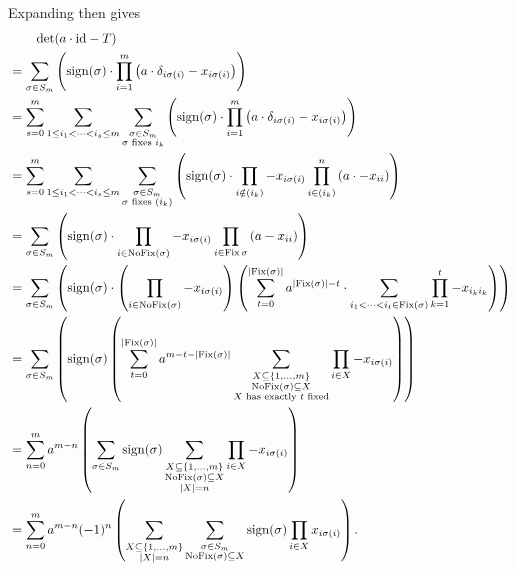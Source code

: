 \begin{problem}
\begin{sol}
		Expanding then gives
		\begin{align*}
			&\qquad \det (a \cdot \mathrm{id} - T) \\
			&= \sum_{\sigma \in S_m} \left( \operatorname{sign}(\sigma)
			\cdot \prod_{i=1}^m \left( a \cdot \delta_{i \sigma(i)} - x_{i \sigma(i)} \right)\right) \\
			&=
			\sum_{s=0}^m
			\sum_{1 \le i_1 < \dots < i_s \le m}
			\sum_{\substack{\sigma \in S_m \\ \sigma \text{ fixes } i_k}}
			\left( \operatorname{sign}(\sigma)
			\cdot \prod_{i=1}^m \left( a \cdot \delta_{i \sigma(i)} - x_{i \sigma(i)} \right)\right) \\
			&=
			\sum_{s=0}^m
			\sum_{1 \le i_1 < \dots < i_s \le m}
			\sum_{\substack{\sigma \in S_m \\ \sigma \text{ fixes } (i_k)}}
			\left( \operatorname{sign}(\sigma)
			\cdot \prod_{i \notin (i_k)} -x_{i \sigma(i)}
			\prod_{i \in (i_k)}^n \left( a \cdot - x_{ii}
			\right)\right) \\
			&=
			\sum_{\sigma \in S_m}
			\left( \operatorname{sign}(\sigma)
			\cdot \prod_{i \in \operatorname{NoFix}(\sigma)} -x_{i \sigma(i)}
			\prod_{i \in \operatorname{Fix}{\sigma}} \left( a - x_{ii}
			\right)\right) \\
			&=
			\sum_{\sigma \in S_m}
			\left( \operatorname{sign}(\sigma)
			\cdot \left( \prod_{i \in \operatorname{NoFix}(\sigma)} -x_{i \sigma(i)} \right)
			\left( \sum_{t=0}^{\left\lvert \operatorname{Fix}(\sigma) \right\rvert}
			a^{\left\lvert \operatorname{Fix}(\sigma) \right\rvert - t} \cdot \sum_{i_1 < \dots < i_t \in \operatorname{Fix}(\sigma)}
			\prod_{k=1}^t -x_{i_k i_k} \right)
			\right) \\
			&=
			\sum_{\sigma \in S_m}
			\left( \operatorname{sign}(\sigma)
			\left( \sum_{t=0}^{\left\lvert \operatorname{Fix}(\sigma) \right\rvert}
			a^{m-t-\left\lvert \operatorname{Fix}(\sigma) \right\rvert}
			\sum_{\substack{X \subseteq \{1, \dots, m\} \\ \operatorname{NoFix}(\sigma) \subseteq X \\ X \text{ has exactly $t$ fixed}}} \prod_{i \in X} -x_{i \sigma(i)}
			\right) \right) \\
			&=
			\sum_{n=0}^m
			a^{m-n}
			\left(
			\sum_{\sigma \in S_m}
			\operatorname{sign}(\sigma)
			\sum_{\substack{X \subseteq \{1, \dots, m\} \\ \operatorname{NoFix}(\sigma) \subseteq X \\ \left\lvert X \right\rvert = n} }
			\prod_{i \in X} -x_{i \sigma(i)}
			\right) \\
			&= \sum_{n=0}^m
			a^{m-n} (-1)^n
			\left(
			\sum_{\substack{X \subseteq \{1, \dots, m\} \\ \left\lvert X \right\rvert = n} }
			\sum_{\substack{\sigma \in S_m \\ \operatorname{NoFix}(\sigma) \subseteq X}}
			\operatorname{sign}(\sigma) \prod_{i \in X} x_{i \sigma(i)}
			\right).
		\end{align*}


\end{sol}
\end{problem}
